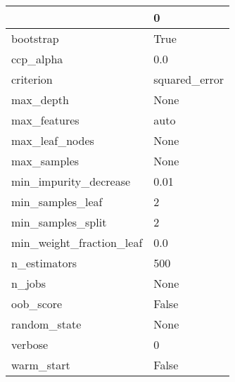 \begin{tabular}{ll}
\toprule
{} &              0 \\
\midrule
bootstrap                &           True \\
ccp\_alpha                &            0.0 \\
criterion                &  squared\_error \\
max\_depth                &           None \\
max\_features             &           auto \\
max\_leaf\_nodes           &           None \\
max\_samples              &           None \\
min\_impurity\_decrease    &           0.01 \\
min\_samples\_leaf         &              2 \\
min\_samples\_split        &              2 \\
min\_weight\_fraction\_leaf &            0.0 \\
n\_estimators             &            500 \\
n\_jobs                   &           None \\
oob\_score                &          False \\
random\_state             &           None \\
verbose                  &              0 \\
warm\_start               &          False \\
\bottomrule
\end{tabular}
